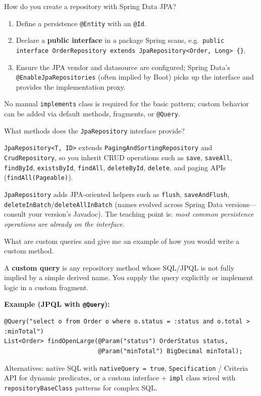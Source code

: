 \question[4]
How do you create a repository with Spring Data JPA?
\begin{solutionorbox}[1.2in]
  \begin{enumerate}
    \item Define a persistence \texttt{@Entity} with an \texttt{@Id}.
    \item Declare a \textbf{public interface} in a package Spring scans, e.g.\ \texttt{public interface OrderRepository extends JpaRepository<Order, Long> \{\}}.
    \item Ensure the JPA vendor and datasource are configured; Spring Data's \texttt{@EnableJpaRepositories} (often implied by Boot) picks up the interface and provides the implementation proxy.
  \end{enumerate}
  No manual \texttt{implements} class is required for the basic pattern; custom behavior can be added via default methods, fragments, or \texttt{@Query}.
\end{solutionorbox}

\question[4]
What methods does the \texttt{JpaRepository} interface provide?
\begin{solutionorbox}[1.35in]
  \texttt{JpaRepository<T, ID>} extends \texttt{PagingAndSortingRepository} and \texttt{CrudRepository}, so you inherit CRUD operations such as \texttt{save}, \texttt{saveAll}, \texttt{findById}, \texttt{existsById}, \texttt{findAll}, \texttt{deleteById}, \texttt{delete}, and paging APIs (\texttt{findAll(Pageable)}).

  \texttt{JpaRepository} adds JPA-oriented helpers such as \texttt{flush}, \texttt{saveAndFlush}, \texttt{deleteInBatch}/\texttt{deleteAllInBatch} (names evolved across Spring Data versions---consult your version's Javadoc). The teaching point is: \emph{most common persistence operations are already on the interface}.
\end{solutionorbox}

\question[4]
What are custom queries and give me an example of how you would write a custom method.
\begin{solutionorbox}[1.45in]
  A \textbf{custom query} is any repository method whose SQL/JPQL is not fully implied by a simple derived name. You supply the query explicitly or implement logic in a custom fragment.

  \noindent\textbf{Example (JPQL with \texttt{@Query}):}
  \begin{lstlisting}[style=java]
@Query("select o from Order o where o.status = :status and o.total > :minTotal")
List<Order> findOpenLarge(@Param("status") OrderStatus status,
                          @Param("minTotal") BigDecimal minTotal);
  \end{lstlisting}

  \noindent Alternatives: native SQL with \texttt{nativeQuery = true}, \texttt{Specification} / Criteria API for dynamic predicates, or a custom interface + \texttt{impl} class wired with \texttt{repositoryBaseClass} patterns for complex SQL.
\end{solutionorbox}

